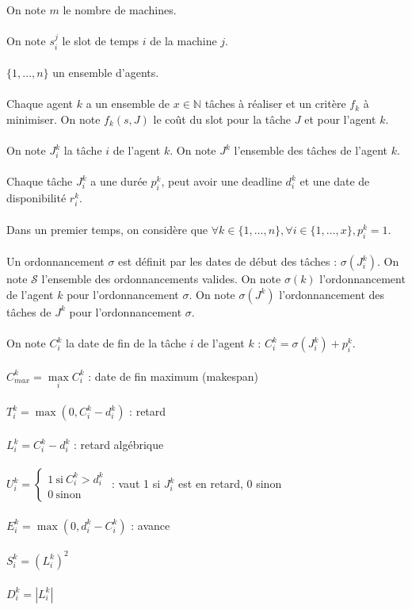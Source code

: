 \documentclass[12pt]{article}
\theoremstyle{definition}
\begin{document}
\noindent
On note $m$ le nombre de machines.\\\\
On note $s_i^j$ le slot de temps $i$ de la machine $j$.\\\\
$\lbrace 1,\dots , n \rbrace$ un ensemble d'agents.\\\\
Chaque agent $k$ a un ensemble de $x \in \mathbb{N}$ tâches à réaliser et un critère $f_k$ à minimiser. On note $f_k(s, J)$ le coût du slot pour la tâche $J$ et pour l'agent $k$.\\\\
On note $J_i^k$ la tâche $i$ de l'agent $k$. On note $J^k$ l'ensemble des tâches de l'agent $k$.\\\\
Chaque tâche $J_i^k$ a une durée $p_i^k$, peut avoir une deadline $d_i^k$ et une date de disponibilité $r_i^k$.\\\\
Dans un premier temps, on considère que $\forall k \in \lbrace 1, \dots , n \rbrace, \forall i \in \lbrace 1, \dots , x \rbrace, p_i^k = 1$.\\\\
Un ordonnancement $\sigma$ est définit par les dates de début des tâches : $\sigma(J_i^k)$. On note $\mathscr{S}$ l'ensemble des ordonnancements valides. On note $\sigma(k)$ l'ordonnancement de l'agent $k$ pour l'ordonnancement $\sigma$. On note $\sigma(J^k)$ l'ordonnancement des tâches de $J^k$ pour l'ordonnancement $\sigma$.\\\\
On note $C_i^k$ la date de fin de la tâche $i$ de l'agent $k$ : $C_i^k = \sigma(J_i^k) + p_i^k$.\\\\
$C_{max}^k = \max\limits_i C_i^k$ : date de fin maximum (makespan)\\\\
$T_i^k = \max(0, C_i^k - d_i^k)$ : retard\\\\
$L_i^k = C_i^k - d_i^k$ : retard algébrique\\\\
$U_i^k = \left\{
\begin{array}{l}
  1 \ \mathrm{si} \ C_i^k>d_i^k \\
  0 \ \mathrm{sinon}
\end{array}
\right.$ : vaut 1 si $J_i^k$ est en retard, 0 sinon\\\\
$E_i^k = \max (0, d_i^k - C_i^k)$ : avance\\\\
$S_i^k = (L_i^k)^2$\\\\
$D_i^k = |L_i^k|$
\end{document}
